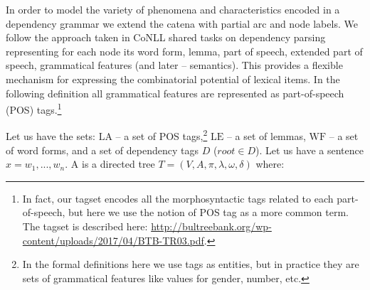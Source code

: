 \documentclass[output=paper,colorlinks,citecolor=brown]{langscibook}
\begin{document}
In order to model the variety of phenomena and characteristics encoded in a dependency grammar we extend the catena with partial arc and node labels. We follow the approach taken in CoNLL shared tasks on dependency parsing \citep{buchholz-marsi-2006-conllx} representing for each node its word form, lemma, part of speech, extended part of speech, grammatical features (and later -- semantics). This provides a flexible mechanism for expressing the combinatorial potential of lexical items. 
In the following definition all grammatical features are represented as part-of-speech (POS) tags.{\footnote{In fact, our tagset encodes all the morphosyntactic tags related to each part-of-speech, but here we use the notion of POS tag as a more common term. The tagset is described here: \url{http://bultreebank.org/wp-content/uploads/2017/04/BTB-TR03.pdf}.}}

Let us have the sets: $\text{LA}$ -- a set of POS tags,\footnote{In the formal definitions here we use tags as entities, but in practice they are sets of grammatical features like values for gender, number, etc.} $\text{LE}$  -- a set of lemmas,  $\text{WF}$  -- a set of word forms, and a set of dependency tags $D$ ($root \in D$).
Let us have a sentence $x = w_1, ..., w_n$. A  is a directed tree $T = (V,A, \pi, \lambda, \omega, \delta)$ where:\largerpage
\end{document}
